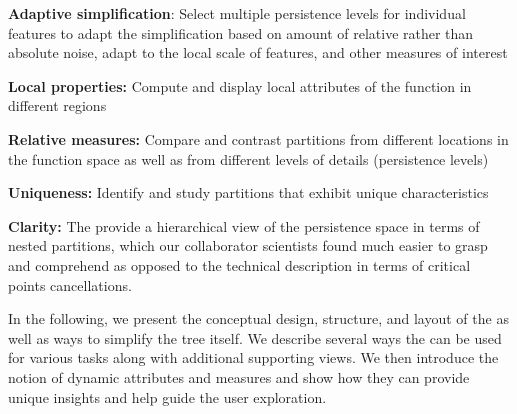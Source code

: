     \noindent  \textbf{Adaptive simplification}: Select multiple persistence levels for individual features to adapt the simplification based on amount of relative rather than absolute noise, adapt to the local scale of features, and other measures of interest
    
    \noindent  \textbf{Local properties:} Compute and display local attributes of the function in different regions
    
    \noindent  \textbf{Relative measures:} Compare and contrast partitions from different locations in the function space as well as from different levels of details (persistence levels)
    
    \noindent  \textbf{Uniqueness:} Identify and study partitions that exhibit unique characteristics
    
    \noindent  \textbf{Clarity:} The \RT provide a hierarchical view of the persistence space in terms of nested partitions, which our collaborator scientists found much easier to grasp and comprehend as opposed to the technical description in terms of critical points cancellations. 

In the following, we present the conceptual design, structure, and layout of the {\RT} as well as ways to simplify the tree itself. We describe several ways the \RT can be used for various tasks along with additional supporting views. We then introduce the notion of dynamic attributes and measures and show how they can provide unique insights and help guide the user exploration.
